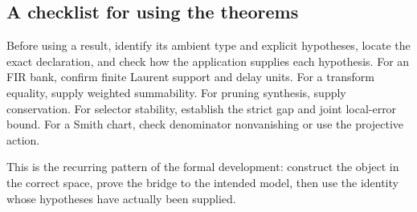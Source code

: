 \subsection{A checklist for using the theorems}
Before using a result, identify its ambient type and explicit hypotheses, locate the exact declaration, and check how the application supplies each hypothesis. For an FIR bank, confirm finite Laurent support and delay units. For a transform equality, supply weighted summability. For pruning synthesis, supply conservation. For selector stability, establish the strict gap and joint local-error bound. For a Smith chart, check denominator nonvanishing or use the projective action.

This is the recurring pattern of the formal development: construct the object in the correct space, prove the bridge to the intended model, then use the identity whose hypotheses have actually been supplied.

